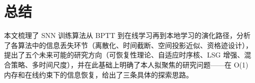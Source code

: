 \documentclass[journal,12pt,onecolumn]{IEEEtran}
\begin{document}
\section{总结}

本文梳理了 SNN 训练算法从 BPTT 到在线学习再到本地学习的演化路径，分析了各算法中的信息丢失环节（离散化、时间截断、空间投影近似、资格迹设计），提出了五个未来可能的研究方向（可恢复性理论、自适应时序核、LSG 增强、混合策略、多时间尺度），并在此基础上明确了本人拟聚焦的研究问题——在 O(1) 内存和在线约束下的信息恢复，给出了三条具体的探索思路。



\end{document}
